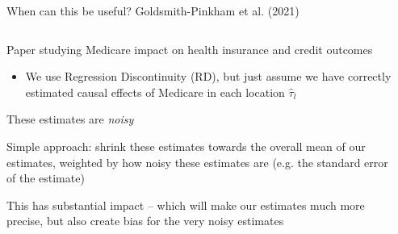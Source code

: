 \documentclass[notes,11pt, aspectratio=169]{beamer}
\newenvironment{wideitemize}{\itemize\addtolength{\itemsep}{10pt}}{\enditemize}
\begin{document}
\begin{frame}{When can this be useful? Goldsmith-Pinkham et al. (2021)}
  \begin{columns}[T] %
    \begin{column}{.5\textwidth}
  \begin{wideitemize}
  \item<1-> Paper studying Medicare impact on health insurance and credit outcomes
    \begin{itemize}
    \item We use Regression Discontinuity (RD), but just assume we
      have correctly estimated causal effects of Medicare in each
      location $\hat{\tau}_{l}$
    \end{itemize}
  \item<1-> These estimates are \emph{noisy}
  \item<2-> Simple approach: shrink these estimates towards the overall
    mean of our estimates, weighted by how noisy these estimates are
    (e.g. the standard error of the estimate)
  \item<3-> This has substantial impact -- which will make our estimates much more precise, but also create bias for the very noisy estimates    
  \end{wideitemize}
\end{column}
\begin{column}{0.5\textwidth}

\end{column}
\end{columns}
\end{frame}
\end{document}
